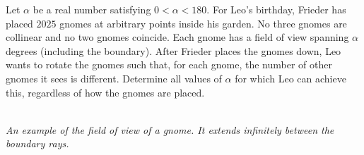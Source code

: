 Let $\alpha$ be a real number satisfying $0 < \alpha < 180$.
For Leo's birthday, Frieder has placed $2025$ gnomes at arbitrary points inside his garden.
No three gnomes are collinear and no two gnomes coincide.
Each gnome has a field of view spanning $\alpha$ degrees (including the boundary).
After Frieder places the gnomes down, Leo wants to rotate the gnomes such that, for each gnome,
the number of other gnomes it sees is different.
Determine all values of $\alpha$ for which Leo can achieve this, regardless of how the gnomes are placed.

\begin{center}
\\
\caption{\emph{An example of the field of view of a gnome. It extends infinitely between the boundary rays.}}
\end{center}
